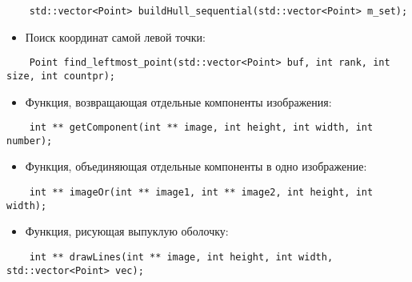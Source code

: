 \documentclass{report}
\begin{document}
\begin{lstlisting}
	std::vector<Point> buildHull_sequential(std::vector<Point> m_set);
\end{lstlisting}
\begin{itemize}
\item Поиск координат самой левой точки:
\end{itemize}
\begin{lstlisting}
	Point find_leftmost_point(std::vector<Point> buf, int rank, int size, int countpr); 
\end{lstlisting}
\begin{itemize}
\item Функция, возвращающая отдельные компоненты изображения:
\end{itemize}
\begin{lstlisting}
	int ** getComponent(int ** image, int height, int width, int number); 
\end{lstlisting}
\begin{itemize}
\item Функция, объединяющая отдельные компоненты в одно изображение:
\end{itemize}
\begin{lstlisting}
	int ** imageOr(int ** image1, int ** image2, int height, int width);
\end{lstlisting}
\begin{itemize}
\item Функция, рисующая выпуклую оболочку:
\end{itemize}
\begin{lstlisting}
	int ** drawLines(int ** image, int height, int width, std::vector<Point> vec);
\end{lstlisting}
\newpage

\end{document}

